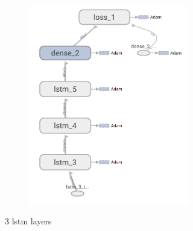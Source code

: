 \begin{figure}
\begin{subfigure}[b]{0.3\linewidth}
\begin{subfigure}[b]{\linewidth}
		\end{subfigure}
	\end{subfigure}
	\begin{subfigure}[b]{0.3\linewidth}
		\begin{subfigure}[b]{\linewidth}
			\includegraphics[width=\linewidth]{plots/rnn-candidates-3-lstm-1-dense.png}
		\end{subfigure}
		\caption{3 lstm layers}
	\end{subfigure}
	\begin{subfigure}[b]{0.3\linewidth}
		\begin{subfigure}[b]{\linewidth}

\end{subfigure}
\end{subfigure}
\end{figure}

